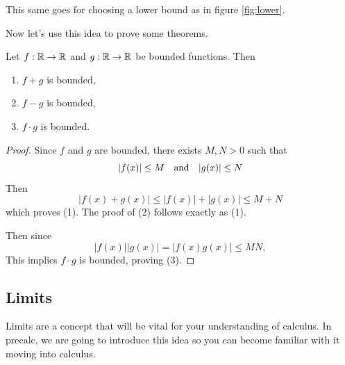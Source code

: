 This same goes for choosing a lower bound as in figure \eqref{fig:lower}.
\begin{figure}[h]
	\centering
	\caption{}
	\label{fig:lower}
\end{figure}

Now let's use this idea to prove some theorems.

\begin{theorem}
Let $f:\mathbb{R}\to\mathbb{R}$ and $g:\mathbb{R}\to\mathbb{R}$ be bounded functions. Then
\begin{enumerate}
	\item $f+g$ is bounded,
	\item $f-g$ is bounded,
	\item $f\cdot g$ is bounded.
\end{enumerate}	
\end{theorem}
\begin{proof}
	Since $f$ and $g$ are bounded, there exists $M,N>0$ such that
	$$|f(x)|\le M \quad\text{and}\quad |g(x)|\le N$$
	Then
	$$|f(x)+g(x)|\le |f(x)|+|g(x)|\le M+N$$
	which proves (1). The proof of (2) follows exactly as (1).
	
	Then since
	$$|f(x)||g(x)|=|f(x)g(x)|\le MN,$$
	This implies $f\cdot g$ is bounded, proving (3).
\end{proof}

\subsection{Limits}
Limits are a concept that will be vital for your understanding of calculus. In precalc, we are going to introduce this idea so you can become familiar with it moving into calculus.

